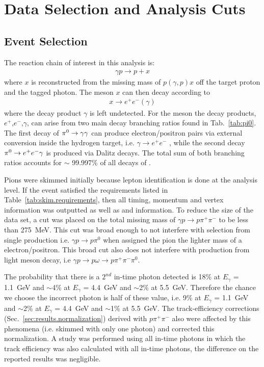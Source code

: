 \section{Data Selection and Analysis Cuts}\label{sec:evnt}
\subsection{Event Selection}\label{subsec:evnt}
	The reaction chain of interest in this analysis is:
	\begin{align}
	\gamma p \rightarrow p + x
	\end{align}
	where $x$ is reconstructed from the missing mass of $p(\gamma,p)x$ off the target proton and the tagged photon. The meson $x$ can then decay according to  
	\begin{align}
	x\rightarrow e^{+}e^{-}(\gamma)
	\end{align}
	where the decay product $\gamma$ is left undetected. For the \pizT meson the decay products, $e^+$,$e^-$,$\gamma$, can arise from two main decay branching ratios found in Tab.~\ref{tab:pi0}. The first decay of $\pi^{0}\rightarrow\gamma\gamma$ can produce electron/positron pairs via external conversion inside the hydrogen target, i.e. $\gamma\rightarrow e^+e^-$ , while the second decay $\pi^{0}\rightarrow e^+e^-\gamma$ is produced via Dalitz decays. The total sum of both branching ratios accounts for $\sim$ 99.997\% of all decays of \pizT.
	
	\FloatBarrier
	Pions were skimmed initially because lepton identification is done at the analysis level. If the event satisfied the requirements listed in Table~\ref{tab:skim.requirements}, then all timing, momentum and vertex information was 
	outputted as well as  and  information. To reduce the size of the data set, a cut 
	was placed on the total missing mass of $\gamma p \to p \pi^{+} \pi^{-}$ to be less than 275~MeV. This cut was broad enough to not interfere with \pizT selection from single 
	\pizT production i.e. $\gamma p \to p \pi^{0}$ when assigned the pion the lighter mass of a electron/positron. This broad cut also does not interfere with \pizT production from 
	light meson decay, i.e $\gamma p \to p \omega \to p \pi^{+} \pi^{-} \pi^{0}$. 
		
	
	The probability that there is a $2^{nd}$ in-time photon detected is 18\% at $E_\gamma$ = 1.1~GeV and $\sim$4\% at $E_\gamma$ = 4.4~GeV and $\sim$2\% at 5.5~GeV. Therefore the chance we choose the incorrect photon is half of these value, i.e. 9\% at $E_\gamma$ = 1.1~GeV and $\sim$2\% at $E_\gamma$ = 4.4~GeV and $\sim$1\% at 5.5~GeV. The track-efficiency corrections (Sec.~\ref{sec:results.normalization}) derived with $p\pi^+\pi^-$ also were affected by this phenomena (i.e. skimmed with only one photon) and corrected this normalization. A study was performed using all in-time photons in which the track efficiency was also calculated with all in-time photons, the difference on the reported results was negligible.
	\FloatBarrier
